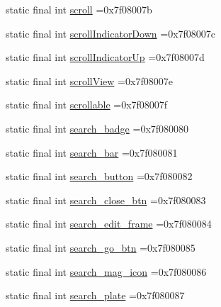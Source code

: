 \begin{DoxyCompactItemize}
\item 
static final int \mbox{\hyperlink{classbr_1_1unb_1_1cic_1_1mp_1_1marketmaster_1_1test_1_1R_1_1id_af78db3c4b32150f6f2b322af268b0255}{scroll}} =0x7f08007b
\item 
static final int \mbox{\hyperlink{classbr_1_1unb_1_1cic_1_1mp_1_1marketmaster_1_1test_1_1R_1_1id_ac3e3b1111b37cf25f20e39c0c5394d01}{scroll\+Indicator\+Down}} =0x7f08007c
\item 
static final int \mbox{\hyperlink{classbr_1_1unb_1_1cic_1_1mp_1_1marketmaster_1_1test_1_1R_1_1id_a7a25d1d2235da58fd142ebdd87db5bce}{scroll\+Indicator\+Up}} =0x7f08007d
\item 
static final int \mbox{\hyperlink{classbr_1_1unb_1_1cic_1_1mp_1_1marketmaster_1_1test_1_1R_1_1id_a43db3d854f469f5c86cbf57bc8076251}{scroll\+View}} =0x7f08007e
\item 
static final int \mbox{\hyperlink{classbr_1_1unb_1_1cic_1_1mp_1_1marketmaster_1_1test_1_1R_1_1id_a2eeb3d8b3634c100ebeff286f93c7a50}{scrollable}} =0x7f08007f
\item 
static final int \mbox{\hyperlink{classbr_1_1unb_1_1cic_1_1mp_1_1marketmaster_1_1test_1_1R_1_1id_a5858b5b9b615da4ce3050022e2a349ea}{search\+\_\+badge}} =0x7f080080
\item 
static final int \mbox{\hyperlink{classbr_1_1unb_1_1cic_1_1mp_1_1marketmaster_1_1test_1_1R_1_1id_ac526faa81ba32a74ebbd7fb13989b5f0}{search\+\_\+bar}} =0x7f080081
\item 
static final int \mbox{\hyperlink{classbr_1_1unb_1_1cic_1_1mp_1_1marketmaster_1_1test_1_1R_1_1id_ad695b266f35fcbc792ccdf0b1826c685}{search\+\_\+button}} =0x7f080082
\item 
static final int \mbox{\hyperlink{classbr_1_1unb_1_1cic_1_1mp_1_1marketmaster_1_1test_1_1R_1_1id_a4e87b8f834689232e3f149170ca0e340}{search\+\_\+close\+\_\+btn}} =0x7f080083
\item 
static final int \mbox{\hyperlink{classbr_1_1unb_1_1cic_1_1mp_1_1marketmaster_1_1test_1_1R_1_1id_aaadcb0758652ad249029b7950536b867}{search\+\_\+edit\+\_\+frame}} =0x7f080084
\item 
static final int \mbox{\hyperlink{classbr_1_1unb_1_1cic_1_1mp_1_1marketmaster_1_1test_1_1R_1_1id_a245c78747b9a8e2367aff05cbbb82370}{search\+\_\+go\+\_\+btn}} =0x7f080085
\item 
static final int \mbox{\hyperlink{classbr_1_1unb_1_1cic_1_1mp_1_1marketmaster_1_1test_1_1R_1_1id_a816c442078dd3db7a2980c80f2b78ed8}{search\+\_\+mag\+\_\+icon}} =0x7f080086
\item 
static final int \mbox{\hyperlink{classbr_1_1unb_1_1cic_1_1mp_1_1marketmaster_1_1test_1_1R_1_1id_a80d03479812cd9b6692ffa52afc1bc1d}{search\+\_\+plate}} =0x7f080087

\end{DoxyCompactItemize}
